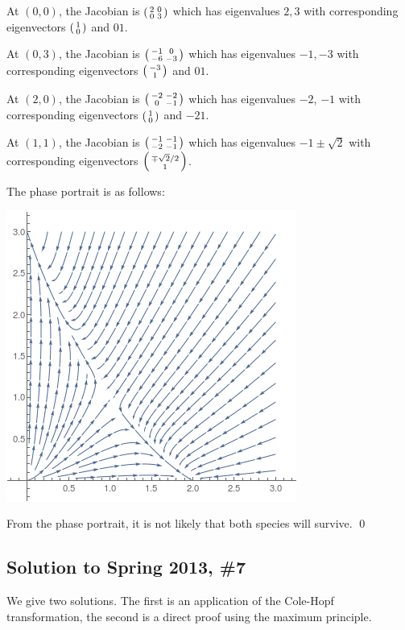At $(0, 0)$, the Jacobian is $\left(\begin{smallmatrix} 2 & 0 \\ 0 & 3\end{smallmatrix}\right)$ which has eigenvalues $2, 3$ with corresponding eigenvectors $\left(\begin{smallmatrix} 1 \\ 0\end{smallmatrix}\right)$ and ${0}{1}$.

At $(0, 3)$, the Jacobian is $\left(\begin{smallmatrix} -1 & 0 \\ -6 & -3\end{smallmatrix}\right)$ which has eigenvalues $-1, -3$ with corresponding eigenvectors $\left(\begin{smallmatrix} -3 \\ 1\end{smallmatrix}\right)$ and ${0}{1}$.

At $(2, 0)$, the Jacobian is $\left(\begin{smallmatrix} -2 & -2 \\ 0 & -1\end{smallmatrix}\right)$ which has eigenvalues $-2$, $-1$ with corresponding eigenvectors $\left(\begin{smallmatrix} 1 \\ 0\end{smallmatrix}\right)$ and ${-2}{1}$.

At $(1, 1)$, the Jacobian is $\left(\begin{smallmatrix} -1 & -1 \\ -2 & -1\end{smallmatrix}\right)$ which has eigenvalues $-1 \pm \sqrt{2}$ with corresponding eigenvectors $\left(\begin{smallmatrix} \mp\sqrt{2}/2 \\ 1\end{smallmatrix}\right)$.

The phase portrait is as follows:
\begin{center}
\includegraphics[scale = 0.75]{./_Figures/S13Q6.png}
\end{center}
\noindent From the phase portrait, it is not likely that both species will survive.
\hfill\qed

\subsection*{Solution to Spring 2013, \#7}\label{s137}
We give two solutions. The first is an application of the Cole-Hopf transformation, the second is a direct proof using the maximum principle.

